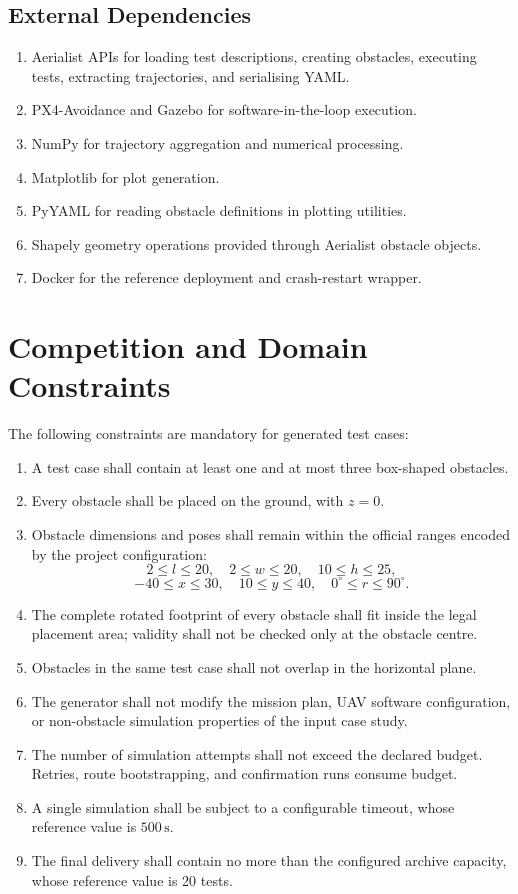 \documentclass[11pt,a4paper,openany]{report}
\begin{document}
\subsection{External Dependencies}
\begin{enumerate}[label=\textbf{D-\arabic*:}]
  \item Aerialist APIs for loading test descriptions, creating obstacles, executing tests, extracting trajectories, and serialising YAML.
  \item PX4-Avoidance and Gazebo for software-in-the-loop execution.
  \item NumPy for trajectory aggregation and numerical processing.
  \item Matplotlib for plot generation.
  \item PyYAML for reading obstacle definitions in plotting utilities.
  \item Shapely geometry operations provided through Aerialist obstacle objects.
  \item Docker for the reference deployment and crash-restart wrapper.
\end{enumerate}

\section{Competition and Domain Constraints}
\label{sec:constraints}
The following constraints are mandatory for generated test cases:
\begin{enumerate}[label=\textbf{C-\arabic*:}]
  \item A test case shall contain at least one and at most three box-shaped obstacles.
  \item Every obstacle shall be placed on the ground, with $z=0$.
  \item Obstacle dimensions and poses shall remain within the official ranges encoded by the project configuration:
  \[
  2 \le l \le 20,\quad 2 \le w \le 20,\quad 10 \le h \le 25,
  \]
  \[
  -40 \le x \le 30,\quad 10 \le y \le 40,\quad 0^\circ \le r \le 90^\circ.
  \]
  \item The complete rotated footprint of every obstacle shall fit inside the legal placement area; validity shall not be checked only at the obstacle centre.
  \item Obstacles in the same test case shall not overlap in the horizontal plane.
  \item The generator shall not modify the mission plan, UAV software configuration, or non-obstacle simulation properties of the input case study.
  \item The number of simulation attempts shall not exceed the declared budget. Retries, route bootstrapping, and confirmation runs consume budget.
  \item A single simulation shall be subject to a configurable timeout, whose reference value is $500\,\mathrm{s}$.
  \item The final delivery shall contain no more than the configured archive capacity, whose reference value is 20 tests.
\end{enumerate}
\end{document}
